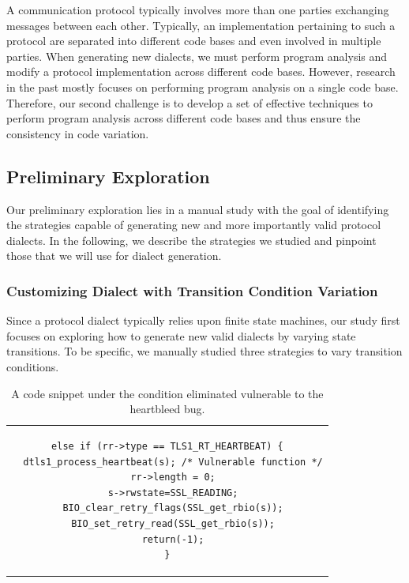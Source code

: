  A communication protocol typically involves
more than one parties exchanging messages between each other. Typically, an
implementation pertaining to such a protocol are separated into different code
bases and even involved in multiple parties. When generating new dialects, we
must perform program analysis and modify a protocol implementation across
different code bases. However, research in the past mostly focuses on performing
program analysis on a single code base. Therefore, our second challenge is to
develop a set of effective techniques to perform program analysis across
different code bases and thus ensure the consistency in code variation.


\subsection{Preliminary Exploration}
\label{sec:task2:obs}

Our preliminary exploration lies in a manual study with the goal of identifying
the strategies capable of generating new and more importantly valid protocol
dialects. In the following, we describe the strategies we studied and pinpoint
those that we will use for dialect generation.

\subsubsection{Customizing Dialect with Transition Condition Variation}

Since a protocol dialect typically relies upon finite state machines, our study
first focuses on exploring how to generate new valid dialects by varying state
transitions. To be specific, we manually studied three strategies to vary
transition conditions.


\begin{table}
\centering
\begin{tabular}{c}
\hspace{12pt}

\begin{lstlisting}  
else if (rr->type == TLS1_RT_HEARTBEAT) {
  dtls1_process_heartbeat(s); /* Vulnerable function */
  rr->length = 0;
  s->rwstate=SSL_READING;
  BIO_clear_retry_flags(SSL_get_rbio(s));
  BIO_set_retry_read(SSL_get_rbio(s));
  return(-1);
}
\end{lstlisting}

\end{tabular}
\caption{A code snippet under the condition eliminated vulnerable to the 
heartbleed bug.}
\label{code:heartbleed}
\end{table} 

